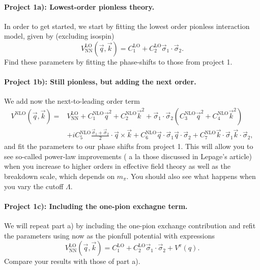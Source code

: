 \documentclass[%
oneside,                 %
final,                   %
10pt]{article}
\begin{document}
\paragraph{Project 1a): Lowest-order pionless theory.}
In order to get started, we start by fitting the lowest order pionless interaction model, given by (excluding isospin)
\[
V^\mathrm{LO}_\mathrm{NN}(\vec{q},\vec{k})=C^\mathrm{LO}_1+C^\mathrm{LO}_2\vec{\sigma}_1\cdot\vec{\sigma}_2.
\]
Find these parameters by fitting the phase-shifts to those from project 1.
\paragraph{Project 1b): Still pionless, but adding the next order.}
We add now the next-to-leading order term
\begin{align*}
V^\mathrm{NLO}(\vec{q},\vec{k})=&V^\mathrm{LO}_\mathrm{NN}+C^\mathrm{NLO}_1\vec{q}^2+C^\mathrm{NLO}_2\vec{k}^2+
\vec{\sigma}_1\cdot\vec{\sigma}_2\left(C^\mathrm{NLO}_3\vec{q}^2+C^\mathrm{NLO}_4\vec{k}^2\right)\\
&+iC^\mathrm{NLO}_5\frac{\vec{\sigma}_1+\vec{\sigma}_2}{2}\cdot\vec{q}\times\vec{k}+C^\mathrm{NLO}_6\vec{q}\cdot\vec{\sigma}_1\vec{q}\cdot\vec{\sigma}_2
+C^\mathrm{NLO}_7\vec{k}\cdot\vec{\sigma}_1\vec{k}\cdot\vec{\sigma}_2,
\end{align*}
and fit the parameters to our phase shifts from project 1. This will allow you to see so-called power-law improvements ( a la those discussed in Lepage's article)
when you increase to higher orders in effective field theory as well as the breakdown scale, which depends on $m_{\pi}$. You should also see what happens when you vary the cutoff $\Lambda$.  
\paragraph{Project 1c): Including the one-pion exchagne term.}
We will repeat part a) by including the one-pion exchange contribution and refit the parameters using now
as the pionfull potential with expressions
\[
V^\mathrm{LO}_\mathrm{NN}(\vec{q},\vec{k})=C^\mathrm{LO}_1+C^\mathrm{LO}_2\vec{\sigma}_1\cdot\vec{\sigma}_2+V^{\pi}(q).
\]
Compare your results with those of part a).
\end{document}
